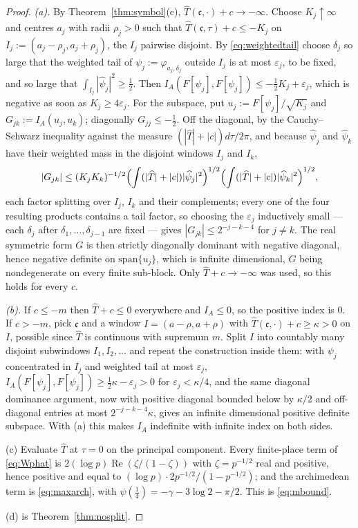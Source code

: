 \documentclass[11pt]{amsart}
\theoremstyle{definition}
\theoremstyle{remark}
\newcommand{\Rel}{\operatorname{Re}}
\newcommand{\Th}{\widehat{T}}
\begin{document}
\begin{proof}
\emph{(a).}  By Theorem~\ref{thm:symbol}(c), $\Th(\mathfrak c,\cdot)+c\to
-\infty$.  Choose $K_j\uparrow\infty$ and centres $a_j$ with radii $\rho_j>0$
such that $\Th(\mathfrak c,\tau)+c\le-K_j$ on
$I_j:=(a_j-\rho_j,a_j+\rho_j)$, the $I_j$ pairwise disjoint.  By
\eqref{eq:weightedtail} choose $\delta_j$ so large that the weighted tail of
$\psi_j:=\varphi_{a_j,\delta_j}$ outside $I_j$ is at most $\varepsilon_j$, to be
fixed, and so large that $\int_{I_j}|\widehat\psi_j|^{2}\ge\tfrac12$.  Then
$I_A(F[\psi_j],F[\psi_j])\le-\tfrac12K_j+\varepsilon_j$, which is negative as
soon as $K_j\ge4\varepsilon_j$.  For the subspace, put
$u_j:=F[\psi_j]/\sqrt{K_j}$ and $G_{jk}:=I_A(u_j,u_k)$; diagonally
$G_{jj}\le-\tfrac12$.  Off the diagonal, by the Cauchy--Schwarz inequality
against the measure $(|\Th|+|c|)d\tau/2\pi$, and because $\widehat\psi_j$ and
$\widehat\psi_k$ have their weighted mass in the disjoint windows $I_j$ and
$I_k$,
\[
|G_{jk}|\le(K_jK_k)^{-1/2}
\Bigl(\int(|\Th|+|c|)|\widehat\psi_j|^{2}\Bigr)^{1/2}
\Bigl(\int(|\Th|+|c|)|\widehat\psi_k|^{2}\Bigr)^{1/2},
\]
each factor splitting over $I_j$, $I_k$ and their complements; every one of the
four resulting products contains a tail factor, so choosing the $\varepsilon_j$
inductively small --- each $\delta_j$ after $\delta_1,\dots,\delta_{j-1}$ are
fixed --- gives $|G_{jk}|\le2^{-j-k-4}$ for $j\ne k$.  The real symmetric form
$G$ is then strictly diagonally dominant with negative diagonal, hence negative
definite on $\mathrm{span}\{u_j\}$, which is infinite dimensional, $G$ being
nondegenerate on every finite sub-block.  Only $\Th+c\to-\infty$ was used, so
this holds for every $c$.

\emph{(b).}  If $c\le-m$ then $\Th+c\le0$ everywhere and $I_A\le0$, so the
positive index is $0$.  If $c>-m$, pick $\mathfrak c$ and a window
$I=(a-\rho,a+\rho)$ with $\Th(\mathfrak c,\cdot)+c\ge\kappa>0$ on $I$, possible
since $\Th$ is continuous with supremum $m$.  Split $I$ into countably many
disjoint subwindows $I_1,I_2,\dots$ and repeat the construction inside them:
with $\psi_j$ concentrated in $I_j$ and weighted tail at most $\varepsilon_j$,
$I_A(F[\psi_j],F[\psi_j])\ge\tfrac12\kappa-\varepsilon_j>0$ for
$\varepsilon_j<\kappa/4$, and the same diagonal dominance argument, now with
positive diagonal bounded below by $\kappa/2$ and off-diagonal entries at most
$2^{-j-k-4}\kappa$, gives an infinite dimensional positive definite subspace.
With (a) this makes $I_A$ indefinite with infinite index on both sides.

(c)  Evaluate $\Th$ at $\tau=0$ on the principal component.  Every finite-place
term of \eqref{eq:Wphat} is $2(\log p)\Rel(\zeta/(1-\zeta))$ with
$\zeta=p^{-1/2}$ real and positive, hence positive and equal to
$(\log p)\cdot2p^{-1/2}/(1-p^{-1/2})$; and the archimedean term is
\eqref{eq:maxarch}, with $\psi(\tfrac14)=-\gamma-3\log2-\pi/2$.  This is
\eqref{eq:mbound}.

(d) is Theorem~\ref{thm:nosplit}.
\end{proof}
\end{document}
